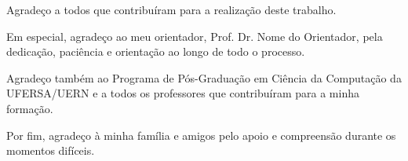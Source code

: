 
\begin{agradecimentos}

Agradeço a todos que contribuíram para a realização deste trabalho.

Em especial, agradeço ao meu orientador, Prof. Dr. Nome do Orientador,
pela dedicação, paciência e orientação ao longo de todo o processo.

Agradeço também ao Programa de Pós-Graduação em Ciência da Computação
da UFERSA/UERN e a todos os professores que contribuíram para a minha
formação.

Por fim, agradeço à minha família e amigos pelo apoio e compreensão
durante os momentos difíceis.

\end{agradecimentos}
